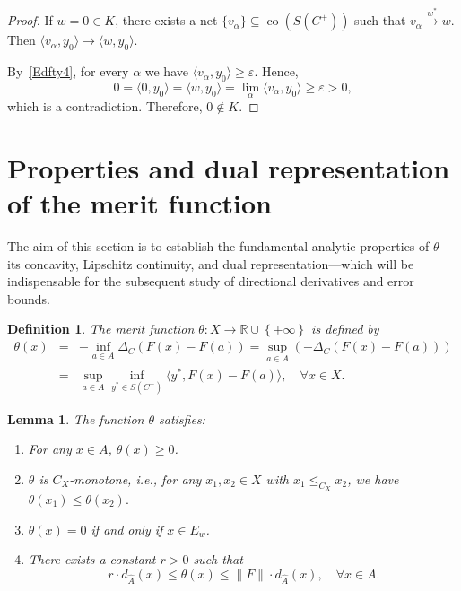 \documentclass[11pt]{article}
\newtheorem{definition}{Definition}[section]
\newtheorem{lemma}{Lemma}[section]
\begin{document}
\begin{proof}
If \(w = 0 \in K\), there exists a net \(\{v_\alpha\} \subseteq \operatorname{co}(S(C^+))\) such that \(v_\alpha \xrightarrow{w^*} w\). Then \(\langle v_\alpha, y_0 \rangle \to \langle w, y_0 \rangle\).

By~\eqref{Edfty4}, for every \(\alpha\) we have \(\langle v_\alpha, y_0 \rangle \ge \varepsilon\). Hence,
\[
0 = \langle 0, y_0 \rangle = \langle w, y_0 \rangle = \lim_\alpha \langle v_\alpha, y_0 \rangle \ge \varepsilon > 0,
\]
which is a contradiction. Therefore, \(0 \notin K\).
   \end{proof}  

\section{Properties and dual representation of the merit function  }\label{sec:merit}

 The aim of this section is to establish the fundamental analytic properties of 
 $\theta$—its concavity, Lipschitz continuity, and dual representation—which will be indispensable for the subsequent study of directional derivatives and error bounds.

\begin{definition}\label{def:theta}  \cite{LiuNgYang2009}
	The merit function $\theta : X \to \mathbb{R}\cup \left\{ +\infty \right\}$ is defined by
	 	\begin{eqnarray*}  	\theta(x) &=& -\inf_{a \in A} \Delta_C(F(x) - F(a)) = \sup_{a \in A} (-\Delta_C(F(x) - F(a))) \\
		&=&   \sup_{a \in A} \inf_{y^* \in S(C^+)} \langle y^*, F(x) - F(a) \rangle, \quad \forall x \in X.
	\end{eqnarray*}
	
	
	
\end{definition}

\begin{lemma} \label{YL:thetaprop} \cite[Theorem 3]{LiuNgYang2009}
	The function $\theta$ satisfies:
	\begin{enumerate}[leftmargin=*,label=(\roman*)]
		\item For any $x \in A$, $\theta(x) \geq 0$.
		\item $\theta$ is $C_X$-monotone, i.e.,  for any $x_1, x_2 \in X$ with $x_1 \le_{C_X} x_2$, we have 	$	  \theta(x_1)   \leq	\theta(x_2) .		$
		\item $\theta(x) = 0$ if and only if $x \in E_w$.
		\item There exists a constant $r > 0$   such that
		\[
		r \cdot d_{\widehat{A}}(x) \leq \theta(x) \leq \|F\| \cdot d_{\widehat{A}}(x), \quad \forall x \in A.
		\]
	\end{enumerate}
\end{lemma}
\end{document}
